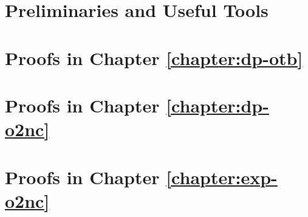 \chapter{Preliminaries and Useful Tools}
\label{appendix:prelim}
\thispagestyle{myheadings}




\chapter{Proofs in Chapter \ref{chapter:dp-otb}}
\label{appendix:dp-otb}
\thispagestyle{myheadings}




\chapter{Proofs in Chapter \ref{chapter:dp-o2nc}}
\label{appendix:dp-o2nc}
\thispagestyle{myheadings}




\chapter{Proofs in Chapter \ref{chapter:exp-o2nc}}
\label{appendix:exp-o2nc}
\thispagestyle{myheadings}

